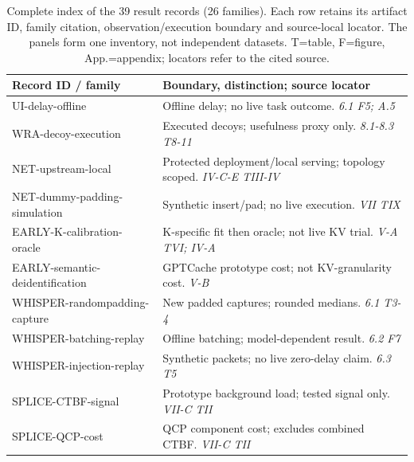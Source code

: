 \begin{table}[!t]\centering\footnotesize
\caption{Complete index of the 39 result records (26 families). Each row retains its artifact ID, family citation, observation/execution boundary and source-local locator. The panels form one inventory, not independent datasets. T=table, F=figure, App.=appendix; locators refer to the cited source.}\label{tab:r9-record-index}
\begin{minipage}[t]{.492\textwidth}\vspace{0pt}
\setlength{\tabcolsep}{2pt}\renewcommand{\arraystretch}{1.04}
\begin{tabularx}{\linewidth}{@{}p{.40\linewidth}X@{}}\toprule
Record ID / family & Boundary, distinction; source locator\\\midrule
UI-\allowbreak{}delay-\allowbreak{}offline~\cite{uitraces2026} & Offline delay; no live task outcome. \emph{6.1 F5; A.5}\\
WRA-\allowbreak{}decoy-\allowbreak{}execution~\cite{jeong2026wra} & Executed decoys; usefulness proxy only. \emph{8.1-8.3 T8-11}\\
NET-\allowbreak{}upstream-\allowbreak{}local~\cite{netecho2025} & Protected deployment/local serving; topology scoped. \emph{IV-C-E TIII-IV}\\
NET-\allowbreak{}dummy-\allowbreak{}padding-\allowbreak{}simulation~\cite{netecho2025} & Synthetic insert/pad; no live execution. \emph{VII TIX}\\
EARLY-\allowbreak{}K-\allowbreak{}calibration-\allowbreak{}oracle~\cite{earlybird2025} & K-specific fit then oracle; not live KV trial. \emph{V-A TVI; IV-A}\\
EARLY-\allowbreak{}semantic-\allowbreak{}deidentification~\cite{earlybird2025} & GPTCache prototype cost; not KV-granularity cost. \emph{V-B}\\
WHISPER-\allowbreak{}randompadding-\allowbreak{}capture~\cite{whisperleak2025} & New padded captures; rounded medians. \emph{6.1 T3-4}\\
WHISPER-\allowbreak{}batching-\allowbreak{}replay~\cite{whisperleak2025} & Offline batching; model-dependent result. \emph{6.2 F7}\\
WHISPER-\allowbreak{}injection-\allowbreak{}replay~\cite{whisperleak2025} & Synthetic packets; no live zero-delay claim. \emph{6.3 T5}\\
SPLICE-\allowbreak{}CTBF-\allowbreak{}signal~\cite{spliceleak2026} & Prototype background load; tested signal only. \emph{VII-C TII}\\
SPLICE-\allowbreak{}QCP-\allowbreak{}cost~\cite{spliceleak2026} & QCP component cost; excludes combined CTBF. \emph{VII-C TII}\\

\end{tabularx}
\end{minipage}
\end{table}
